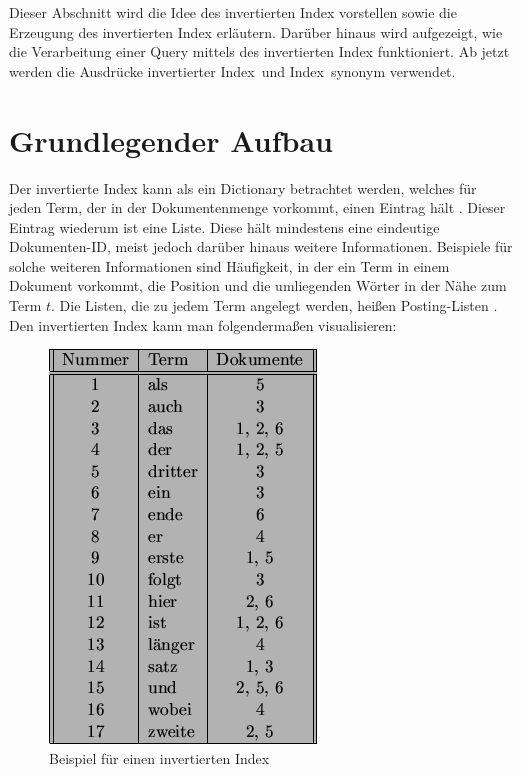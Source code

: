 Dieser Abschnitt wird die Idee des invertierten Index vorstellen sowie die Erzeugung des invertierten Index erläutern. Darüber hinaus wird aufgezeigt, wie die Verarbeitung einer Query mittels des invertierten Index funktioniert. Ab jetzt werden die Ausdrücke \glqq invertierter Index\grqq\ und \glqq Index\grqq\ synonym verwendet.
\section{Grundlegender Aufbau}
Der invertierte Index kann als ein Dictionary betrachtet werden, welches für jeden Term, der in der Dokumentenmenge vorkommt, einen Eintrag hält \cite[S. 6 f.]{IR_Intro_Cambridge} \cite{IR_Uni_Bamberg}. Dieser Eintrag wiederum ist eine Liste. Diese hält mindestens eine eindeutige Dokumenten-ID, meist jedoch darüber hinaus weitere Informationen. Beispiele für solche weiteren Informationen sind Häufigkeit, in der ein Term in einem Dokument vorkommt, die Position und die umliegenden Wörter in der Nähe zum Term $t$.
Die Listen, die zu jedem Term angelegt werden, heißen Posting-Listen \cite[S. 6]{IR_Intro_Cambridge}.
\newline
Den invertierten Index kann man folgendermaßen visualisieren:
\begin{figure}[H]
	\centering
	\includegraphics[scale=0.5]{../Abbildungen/index.png}
	\caption{Beispiel für einen invertierten Index \cite{index_Uni_Munich}}
\end{figure}

